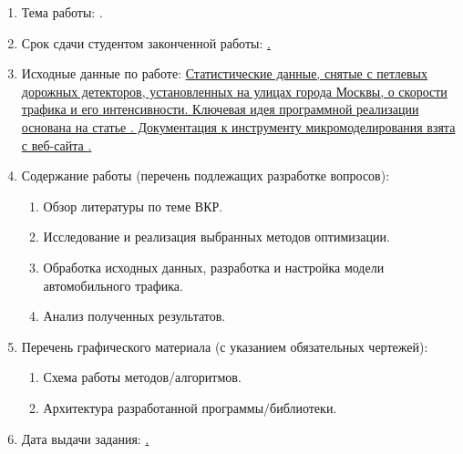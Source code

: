 \begin{enumerate}[1.]
	\item Тема работы: {\expandafter \ulined \thesisTitle.}
	\item Срок сдачи студентом законченной работы: \uline{\thesisDeadline.} 
	\item Исходные данные по работе: \uline{Статистические данные, снятые с петлевых дорожных детекторов, установленных на улицах города Москвы, о скорости трафика и его интенсивности. Ключевая идея программной реализации основана на статье \cite{Chen2007AlgorithmsFT}. Документация к инструменту микромоделирования взята с веб-сайта \cite{sumo-docs}.}%
	
	\printbibliographyTask %
	\item Содержание работы (перечень подлежащих разработке вопросов):
	\begin{enumerate}[label=\theenumi\arabic*.]
		\item Обзор литературы по теме ВКР.
		\item Исследование и реализация выбранных методов оптимизации.
		\item Обработка исходных данных, разработка и настройка модели автомобильного трафика.
		\item Анализ полученных результатов. 
	\end{enumerate}
		\item Перечень графического материала (с указанием обязательных чертежей): 
	\begin{enumerate}[label=\theenumi\arabic*.]
		\item Схема работы методов/алгоритмов.
		\item Архитектура разработанной программы/библиотеки.
	\end{enumerate}	
		\item Дата выдачи задания: \uline{\thesisStartDate.}
\end{enumerate}

